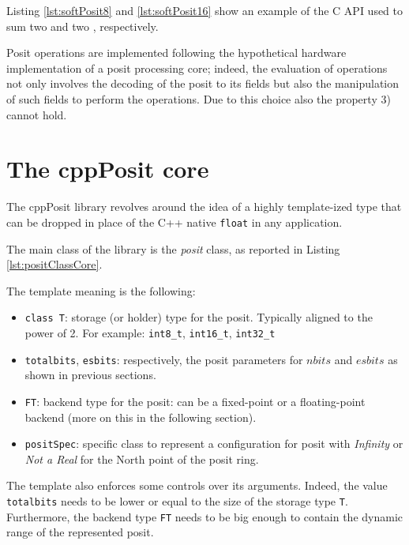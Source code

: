 Listing \ref{lst:softPosit8} and \ref{lst:softPosit16} show an example of the C API used to sum two  and two , respectively.






Posit operations are implemented following the hypothetical hardware implementation of a posit processing core; indeed, the evaluation of operations not only involves the decoding of the posit to its fields but also the manipulation of such fields to perform the operations. Due to this choice also the property 3) cannot hold.

\section{The cppPosit core}\label{sec:cppPositCore}

The cppPosit library revolves around the idea of a highly template-ized type that can be dropped in place of the C++ native \texttt{float} in any application. 

The main class of the library is the \textit{posit} class, as reported in Listing \ref{lst:positClassCore}.  



The template meaning is the following:
\begin{itemize}
    \item \texttt{class T}: storage (or holder) type for the posit. Typically aligned to the power of 2. For example: \texttt{int8\_t}, \texttt{int16\_t}, \texttt{int32\_t}
    \item \texttt{totalbits}, \texttt{esbits}: respectively, the posit parameters for $nbits$ and $esbits$ as shown in previous sections.
    \item \texttt{FT}: backend type for the posit: can be a fixed-point or a floating-point backend (more on this in the following section).
    \item \texttt{positSpec}: specific class to represent a configuration for posit with \textit{Infinity} or \textit{Not a Real} for the North point of the posit ring.
\end{itemize}

The template also enforces some controls over its arguments. Indeed, the value \texttt{totalbits} needs to be lower or equal to the size of the storage type \texttt{T}. Furthermore, the backend type \texttt{FT} needs to be big enough to contain the dynamic range of the represented posit.


